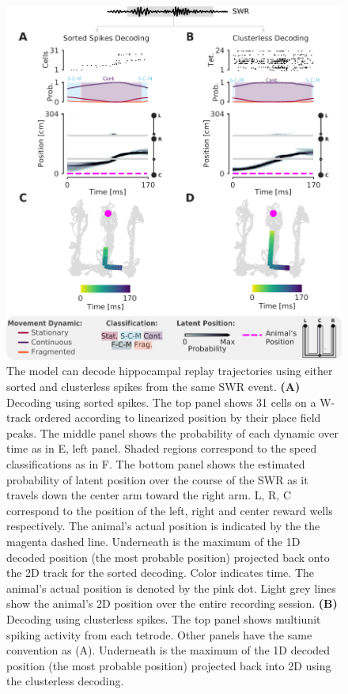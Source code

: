 \documentclass[9pt,lineno]{elife}
\begin{document}
\begin{figure}
\includegraphics[width=0.8\linewidth]{figures/Figure2/Figure2_final}
\caption{The model can decode hippocampal replay trajectories using either sorted and clusterless spikes from the same SWR event. \textbf{(A)} Decoding using sorted spikes. The top panel shows 31 cells on a W-track ordered according to linearized position by their place field peaks. The middle panel shows the probability of each dynamic over time as in E, left panel. Shaded regions correspond to the speed classifications as in F. The bottom panel shows the estimated probability of latent position over the course of the SWR as it travels down the center arm toward the right arm. L, R, C correspond to the position of the left, right and center reward wells respectively. The animal's actual position is indicated by the the magenta dashed line. Underneath is the maximum of the 1D decoded position (the most probable position) projected back onto the 2D track for the sorted decoding. Color indicates time. The animal's actual position is denoted by the pink dot. Light grey lines show the animal's 2D position over the entire recording session. \textbf{(B)} Decoding using clusterless spikes. The top panel shows multiunit spiking activity from each tetrode. Other panels have the same convention as (A). Underneath is the maximum of the 1D decoded position (the most probable position) projected back into 2D using the clusterless decoding.
}
\label{fig:2}


\end{figure}
\end{document}
